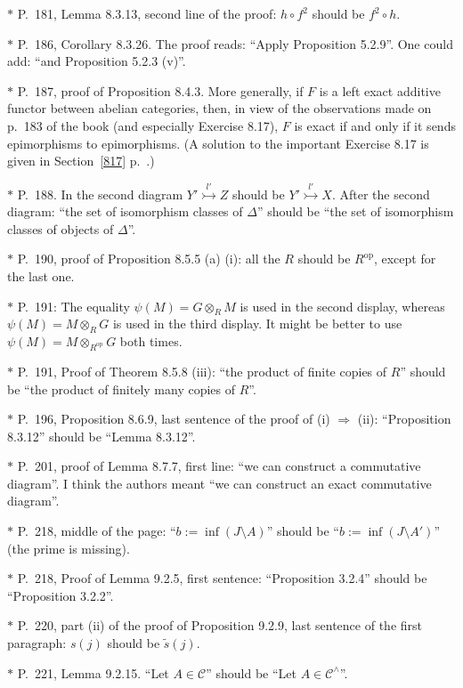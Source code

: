 \documentclass[12pt]{article}%
\theoremstyle{remark}
\theoremstyle{definition}
\newcommand{\nn}{\noindent}
\newcommand{\C}{\mathcal C}
\newcommand{\then}{\Rightarrow}
\DeclareMathOperator{\op}{op}
\begin{document}
\nn$*$ P.~181, Lemma 8.3.13, second line of the proof: $h\circ f^2$ should be $f^2\circ h$.

\nn$*$ P.~186, Corollary 8.3.26. The proof reads: ``Apply Proposition 5.2.9''. One could add: ``and Proposition 5.2.3 (v)''.

\nn$*$ P.~187, proof of Proposition 8.4.3. More generally, if $F$ is a left exact additive functor between abelian categories, then, in view of the observations made on p.~183 of the book (and especially Exercise 8.17), $F$ is exact if and only if it sends epimorphisms to epimorphisms. (A solution to the important Exercise 8.17 is given in Section~\ref{817} p.~\pageref{817}.)

\nn$*$ P.~188. In the second diagram $Y'\overset{l'}{\rightarrowtail}Z$ should be $Y'\overset{l'}{\rightarrowtail}X$. After the second diagram: ``the set of isomorphism classes of $\Delta$'' should be ``the set of isomorphism classes of objects of $\Delta$''.

\nn$*$ P.~190, proof of Proposition 8.5.5 (a) (i): all the $R$ should be $R^{\op}$, except for the last one.

\nn$*$ P.~191: The equality $\psi(M)=G\otimes_RM$ is used in the second display, whereas $\psi(M)=M\otimes_RG$ is used in the third display. It might be better to use $\psi(M)=M\otimes_{R^{\op}}G$ both times. 

\nn$*$ P.~191, Proof of Theorem 8.5.8 (iii): ``the product of finite copies of $R$'' should be ``the product of finitely many copies of $R$''.

\nn$*$ P.~196, Proposition 8.6.9, last sentence of the proof of (i) $\then$ (ii): ``Proposition 8.3.12'' should be ``Lemma 8.3.12''.

\nn$*$ P.~201, proof of Lemma 8.7.7, first line: ``we can construct a commutative diagram''. I think the authors meant ``we can construct an exact commutative diagram''.

\nn$*$ P.~218, middle of the page: ``$b:=\inf(J\setminus A)$'' should be ``$b:=\inf(J\setminus A')$'' (the prime is missing). 

\nn$*$ P.~218, Proof of Lemma 9.2.5, first sentence: ``Proposition 3.2.4'' should be ``Proposition 3.2.2''.

\nn$*$ P.~220, part (ii) of the proof of Proposition 9.2.9, last sentence of the first paragraph: $s(j)$ should be $\tilde s(j)$.

\nn$*$ P.~221, Lemma 9.2.15. ``Let $A\in\C$'' should be ``Let $A\in\C^\wedge$''.
\end{document}
